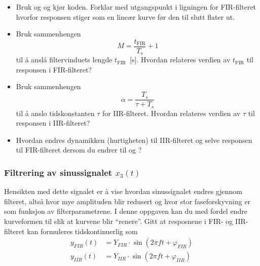  
  \begin{itemize}
  \item Bruk   og   og kjør
    koden. Forklar med utgangspunkt i ligningen for FIR-filteret
    hvorfor responsen stiger som en lineær kurve før den
    til slutt flater ut.

  \item Bruk sammenhengen
    \begin{equation}
      M =\frac{t_{\text{FIR}}}{T_{s}}+ 1
    \end{equation}
    til å anslå filtervinduets lengde $t_{\text{FIR}}$~[s].  Hvordan
    relateres verdien av $t_{\text{FIR}}$ til responsen i FIR-filteret?
    
  \item Bruk sammenhengen
    \begin{equation}
  \label{eq:12ny}
  \boxed{\alpha = \frac{T_{s}}{\tau + T_{s}} }
\end{equation}
til å anslo  tidskonstanten $\tau$ for IIR-filteret. Hvordan
relateres verdien av $\tau$ til responsen i IIR-filteret?
   

  \item Hvordan endres dynamikken (hurtigheten) til IIR-filteret og
    selve responsen til FIR-filteret dersom du endrer til
     og  ?

\end{itemize}

\newpage

\subsubsection*{\bf Filtrering av sinussignalet $x_{3}(t)$}

  Hensikten med dette signalet er å
  vise hvordan sinussignalet endres gjennom filteret, altså hvor mye
  amplituden blir redusert og hvor stor faseforskyvning er som
  funksjon av filterparametrene.   I denne oppgaven
  kan du med fordel endre kurveformen til  slik 
  at kurvene blir ``renere''. 
 Gitt at resposnene i FIR- og IIR-filteret kan formuleres
    tidskontinuerlig som 
    \begin{align}
      \label{eq:11}
      y_{FIR}(t) & = Y_{FIR}{\cdot} \sin(2\pi f t + \varphi_{FIR}) \\
      y_{IIR}(t) & = Y_{IIR} {\cdot}\sin(2\pi f t + \varphi_{IIR}) 
    \end{align}

